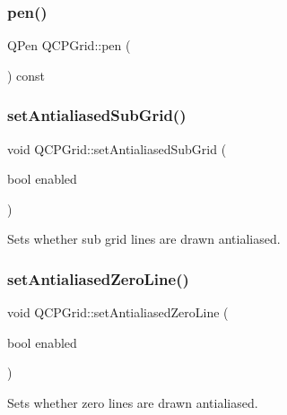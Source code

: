 \mbox{\label{class_q_c_p_grid_a1d68418766b3408c0b7b29ef40b04c2a}} 
\subsubsection{\texorpdfstring{pen()}{pen()}}
{\footnotesize\ttfamily Q\+Pen Q\+C\+P\+Grid\+::pen (\begin{DoxyParamCaption}{ }\end{DoxyParamCaption}) const\hspace{0.3cm}{\ttfamily [inline]}}

\mbox{\label{class_q_c_p_grid_a5692310ba183721a413d60951407d114}} 
\subsubsection{\texorpdfstring{setAntialiasedSubGrid()}{setAntialiasedSubGrid()}}
{\footnotesize\ttfamily void Q\+C\+P\+Grid\+::set\+Antialiased\+Sub\+Grid (\begin{DoxyParamCaption}\item[{bool}]{enabled }\end{DoxyParamCaption})}

Sets whether sub grid lines are drawn antialiased. \mbox{\label{class_q_c_p_grid_a3cc6d54647393ee71afb6da56af07aa4}} 
\subsubsection{\texorpdfstring{setAntialiasedZeroLine()}{setAntialiasedZeroLine()}}
{\footnotesize\ttfamily void Q\+C\+P\+Grid\+::set\+Antialiased\+Zero\+Line (\begin{DoxyParamCaption}\item[{bool}]{enabled }\end{DoxyParamCaption})}

Sets whether zero lines are drawn antialiased. \mbox{\label{class_q_c_p_grid_aa05ab9816ffb440908171e45e833b593}} 
